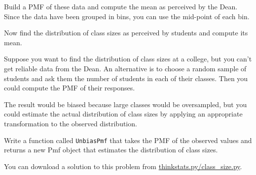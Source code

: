 \documentclass[12pt]{book}
\begin{document}
\begin{ex}


Build a PMF of these data and compute the mean as perceived by the
Dean.  Since the data have been grouped in bins, you can use the
mid-point of each bin.

Now find the distribution of class sizes as perceived by students
and compute its mean.  

Suppose you want to find the distribution of class sizes at a
college, but you can't get reliable data from the Dean.
An alternative is to choose a random sample of students and ask them
the number of students in each of their classes.  Then you could compute
the PMF of their responses.


The result would be biased because large classes
would be oversampled, but you could estimate the actual
distribution of class sizes by applying an appropriate transformation
to the observed distribution.

Write a function called \verb"UnbiasPmf" that takes the PMF of the
observed values and returns a new Pmf object that estimates the
distribution of class sizes.

You can download a solution to this problem from
\url{thinkstats.py/class_size.py}.


\end{ex}
\end{document}
